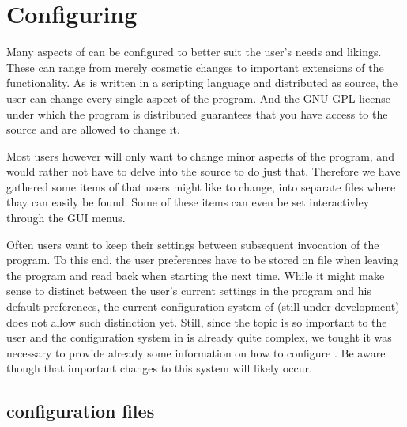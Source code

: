 
\chapter{Configuring \pyf}
\label{cha:config}

Many aspects of \pyf can be configured to better suit the user's needs and likings. These can range from merely cosmetic changes to important extensions of the functionality. As \pyf is written in a scripting language and distributed as source, the user can change every single aspect of the program. And the GNU-GPL license under which the program is distributed guarantees that you have access to the source and are allowed to change it.

Most users however will only want to change minor aspects of the program, and would rather not have to delve into the source to do just that. Therefore we have gathered some items of \pyf that users might like to change, into separate files where thay can easily be found. Some of these items can even be set interactivley through the GUI menus.

Often users want to keep their settings between subsequent invocation of the program. To this end, the user preferences have to be stored on file when leaving the program and read back when starting the next time. While it might make sense to distinct between the user's current settings in the program and his default preferences, the current configuration system of \pyf (still under development) does not allow such distinction yet. Still, since the topic is so important to the user and the configuration system in \pyf is already quite complex, we tought it was necessary to provide already some information on how to configure \pyf.
Be aware though that important changes to this system will likely occur.

\section{\pyf configuration files}
\label{sec:pyf-conf-files}

